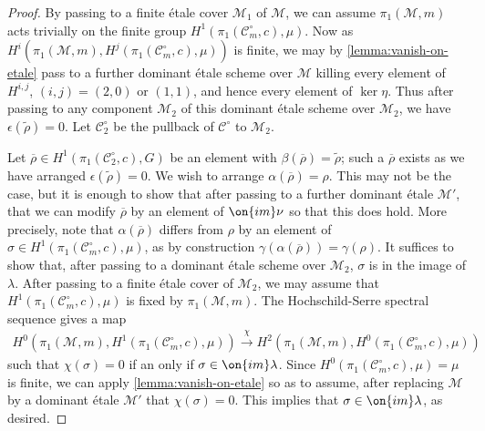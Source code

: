 \documentclass[12 pt]{amsart}
\theoremstyle{plain}
\theoremstyle{definition}
\theoremstyle{remark}
\numberwithin{equation}{section}
\begin{document}
\begin{proof}
By passing to a finite \'etale cover $\mathscr{M}_1$ of $\mathscr{M}$, we can assume $\pi_1(\mathscr{M}, m)$ acts trivially on the finite group $H^1(\pi_1(\mathscr{C}_m^\circ, c), \mu)$.  Now as $H^i(\pi_1(\mathscr M, m), H^j(\pi_1(\mathscr C^\circ_m,c),
\mu))$ is finite, we may by \autoref{lemma:vanish-on-etale} pass to a further
dominant \'etale scheme over $\mathscr{M}$ killing every element of $H^{i,j}$,
$(i,j)=(2,0) \text{ or } (1,1)$, and hence every element of $\ker \eta$. Thus
after passing to any component $\mathscr{M}_2$ of this dominant \'etale scheme
over $\mathscr M_2$, we have $\epsilon(\widetilde\rho)=0$. Let $\mathscr{C}_2^\circ$ be the pullback of $\mathscr{C}^\circ$ to $\mathscr{M}_2$. 

Let $\overline{\rho} \in H^1(\pi_1(\mathscr C_2^\circ, c), G)$
be an element with $\beta(\overline{\rho}) = \widetilde{\rho}$; such a $\overline{\rho}$ exists as we have arranged $\epsilon(\widetilde{\rho})=0$. 
We wish to arrange $\alpha(\overline{\rho}) =\rho$. 
This may not be the case, but it is enough to show that after passing to a further dominant
\'etale $\mathscr M'$,
that we can modify $\overline{\rho}$ by an element of $\on{im}\nu$ so that this
does hold.
More precisely, note that $\alpha(\overline{\rho})$ differs from $\rho$ by an
element of $\sigma\in H^1(\pi_1(\mathscr{C}^\circ_m, c), \mu)$, as by
construction $\gamma(\alpha(\overline{\rho}))=\gamma(\rho)$. It suffices to show
that, after passing to a dominant \'etale scheme over $\mathscr{M}_2$, $\sigma$ is in the image of $\lambda$. After passing to a finite \'etale cover of $\mathscr{M}_2$, we may assume that $H^1(\pi_1(\mathscr{C}^\circ_m, c), \mu)$ is fixed by $\pi_1(\mathscr{M}, m)$.
The Hochschild-Serre spectral sequence gives a map
\begin{align*}
	H^0(\pi_1(\mathscr M, m), H^1(\pi_1({\mathscr C}_{m}^\circ,c), \mu))
\xrightarrow{\chi}
H^2(\pi_1(\mathscr M, m), H^0(\pi_1({\mathscr C}^\circ_{m}, c), \mu))
\end{align*}
such that $\chi(\sigma) = 0$ if an only if $\sigma \in \on{im}\lambda$.
Since $H^0(\pi_1({\mathscr C}^\circ_{m}, c), \mu)=\mu$
is finite, we can apply
\autoref{lemma:vanish-on-etale} so as to assume, after replacing $\mathscr M$ by
a dominant \'etale $\mathscr M'$
that $\chi(\sigma) = 0$.
This implies that $\sigma \in \on{im}\lambda$, as desired.
\end{proof}
\end{document}
